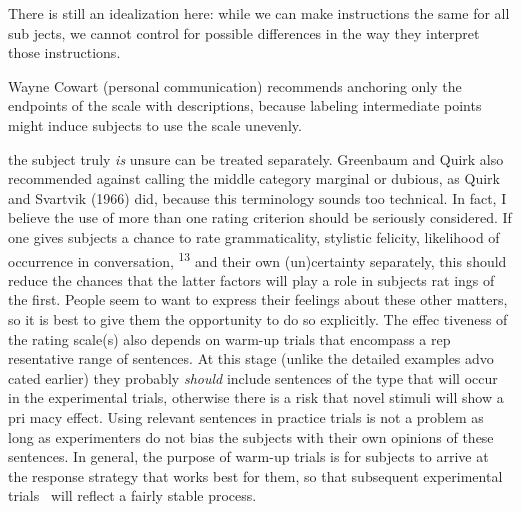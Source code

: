 \setcounter{listWWNumxviiileveli}{10}
\begin{listWWNumxviiileveli}
\item 
\begin{styleStandard}
There is still an idealization here: while we can make instructions the same for all sub\- jects, we cannot control for possible differences in the way they interpret those instructions.
\end{styleStandard}


\item 
\begin{styleStandard}
Wayne Cowart (personal communication) recommends anchoring only the endpoints of the scale with descriptions, because labeling intermediate points might induce subjects to use the scale unevenly.
\end{styleStandard}


\end{listWWNumxviiileveli}
\clearpage\setcounter{page}{1}\begin{styleStandard}
the subject truly \textit{is}\textit{ }unsure can be treated separately. Greenbaum and Quirk also recommended against calling the middle category {\textquotedbl}marginal or dubious,{\textquotedbl} as Quirk and Svartvik (1966) did, because this terminology sounds too technical. In fact, I believe the use of more than one rating criterion should be seriously considered. If one gives subjects a chance to rate grammaticality, stylistic felicity, likelihood of occurrence in conversation, \textsuperscript{13}\textsuperscript{ }and their own (un)certainty separately, this should reduce the chances that the latter factors will play a role in subjects{\textquotesingle} rat\- ings of the first. People seem to want to express their feelings about these other matters, so it is best to give them the opportunity to do so explicitly. The effec\- tiveness of the rating scale(s) also depends on warm-up trials that encompass a rep\- resentative range of sentences. At this stage (unlike the detailed examples advo\- cated earlier) they probably \textit{should}\textit{ }include sentences of the type that will occur in the experimental trials, otherwise there is a risk that novel stimuli will show a pri\- macy effect. Using relevant sentences in practice trials is not a problem as long as experimenters do not bias the subjects with their own opinions of these sentences. In general, the purpose of warm-up trials is for subjects to arrive at the response strategy that works best for them, so that subsequent experimental trials \ will reflect a fairly stable process.
\end{styleStandard}


